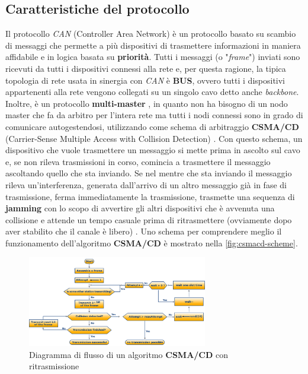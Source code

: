 \subsection{Caratteristiche del protocollo}
Il protocollo \emph{CAN} (Controller Area Network) è un protocollo basato su scambio di messaggi che permette a più dispositivi di trasmettere informazioni in maniera affidabile e in logica basata su \textbf{priorità}. Tutti i messaggi (o "\emph{frame}") inviati sono ricevuti da tutti i dispositivi connessi alla rete e, per questa ragione, la tipica topologia di rete usata in sinergia con \emph{CAN} è \textbf{BUS}, ovvero tutti i dispositivi appartenenti alla rete vengono collegati su un singolo cavo detto anche \emph{backbone}. Inoltre, è un protocollo \textbf{multi-master} \cite{huang_2019_invehicle}, in quanto non ha bisogno di un nodo master che fa da arbitro per l'intera rete ma tutti i nodi connessi sono in grado di comunicare autogestendosi, utilizzando come schema di arbitraggio \textbf{CSMA/CD} (Carrier-Sense Multiple Access with Collision Detection) \cite{can_notes}. Con questo schema, un dispositivo che vuole trasmettere un messaggio si mette prima in ascolto sul cavo e, se non rileva trasmissioni in corso, comincia a trasmettere il messaggio ascoltando quello che sta inviando. Se nel mentre che sta inviando il messaggio rileva un'interferenza, generata dall'arrivo di un altro messaggio già in fase di trasmissione, ferma immediatamente la trasmissione, trasmette una sequenza di \textbf{jamming} con lo scopo di avvertire gli altri dispositivi che è avvenuta una collisione e attende un tempo casuale prima di ritrasmettere (ovviamente dopo aver stabilito che il canale è libero) \cite{wikipedia_csmacd}. Uno schema per comprendere meglio il funzionamento dell'algoritmo \textbf{CSMA/CD} è mostrato nella \autoref{fig:csmacd-scheme}.
\begin{figure}[h]
    \centering
    \includegraphics[width=0.7\textwidth]{capitoli/figure-protocolli/CSMACD-Algorithm.png}
    \caption{Diagramma di flusso di un algoritmo \textbf{CSMA/CD} con ritrasmissione}
    \label{fig:csmacd-scheme}
\end{figure}

